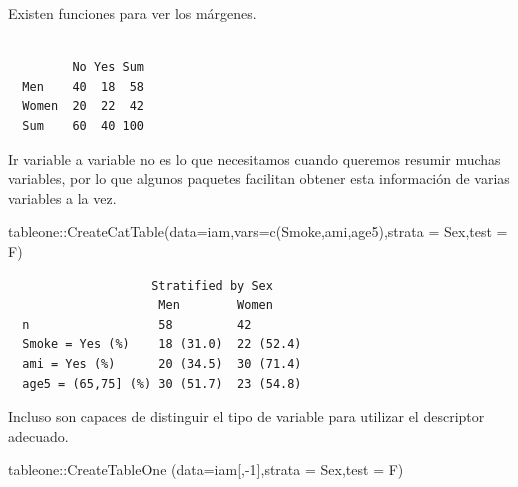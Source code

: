 \documentclass[
  letterpaper,
  DIV=11,
  numbers=noendperiod]{scrreprt}
\newenvironment{Shaded}{\begin{snugshade}}{\end{snugshade}}
\newcommand{\AttributeTok}[1]{\textcolor[rgb]{0.40,0.45,0.13}{#1}}
\newcommand{\DecValTok}[1]{\textcolor[rgb]{0.68,0.00,0.00}{#1}}
\newcommand{\FunctionTok}[1]{\textcolor[rgb]{0.28,0.35,0.67}{#1}}
\newcommand{\NormalTok}[1]{\textcolor[rgb]{0.00,0.23,0.31}{#1}}
\newcommand{\SpecialCharTok}[1]{\textcolor[rgb]{0.37,0.37,0.37}{#1}}
\newcommand{\StringTok}[1]{\textcolor[rgb]{0.13,0.47,0.30}{#1}}
\begin{document}
Existen funciones para ver los márgenes.

\begin{Shaded}
\end{Shaded}

\begin{verbatim}
       
         No Yes Sum
  Men    40  18  58
  Women  20  22  42
  Sum    60  40 100
\end{verbatim}

Ir variable a variable no es lo que necesitamos cuando queremos resumir
muchas variables, por lo que algunos paquetes facilitan obtener esta
información de varias variables a la vez.

\begin{Shaded}
\begin{Highlighting}[]
\NormalTok{tableone}\SpecialCharTok{::}\FunctionTok{CreateCatTable}\NormalTok{(}\AttributeTok{data=}\NormalTok{iam,}\AttributeTok{vars=}\FunctionTok{c}\NormalTok{(}\StringTok{\textquotesingle{}Smoke\textquotesingle{}}\NormalTok{,}\StringTok{\textquotesingle{}ami\textquotesingle{}}\NormalTok{,}\StringTok{\textquotesingle{}age5\textquotesingle{}}\NormalTok{),}\AttributeTok{strata =} \StringTok{\textquotesingle{}Sex\textquotesingle{}}\NormalTok{,}\AttributeTok{test =}\NormalTok{ F)}
\end{Highlighting}
\end{Shaded}

\begin{verbatim}
                    Stratified by Sex
                     Men        Women     
  n                  58         42        
  Smoke = Yes (%)    18 (31.0)  22 (52.4) 
  ami = Yes (%)      20 (34.5)  30 (71.4) 
  age5 = (65,75] (%) 30 (51.7)  23 (54.8) 
\end{verbatim}

Incluso son capaces de distinguir el tipo de variable para utilizar el
descriptor adecuado.

\begin{Shaded}
\begin{Highlighting}[]
\NormalTok{tableone}\SpecialCharTok{::}\FunctionTok{CreateTableOne}\NormalTok{ (}\AttributeTok{data=}\NormalTok{iam[,}\SpecialCharTok{{-}}\DecValTok{1}\NormalTok{],}\AttributeTok{strata =} \StringTok{\textquotesingle{}Sex\textquotesingle{}}\NormalTok{,}\AttributeTok{test =}\NormalTok{ F)}
\end{Highlighting}
\end{Shaded}
\end{document}
